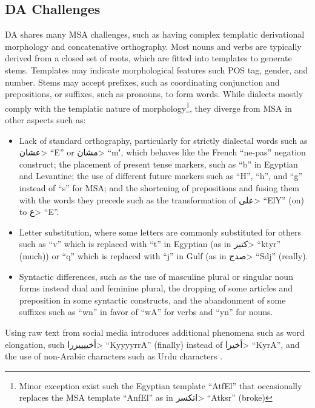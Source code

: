 \documentclass[11pt,letterpaper]{article}
\begin{document}
\subsection{DA Challenges}
DA shares many MSA challenges, such as having complex templatic derivational morphology and concatenative orthography. Most  nouns and verbs are typically derived from a closed set of roots, which are fitted into templates to generate stems. Templates may indicate morphological features such POS tag, gender, and number. Stems may accept prefixes, such as coordinating conjunction and prepositions, or suffixes, such as pronouns, to form words. While dialects mostly comply with the templatic nature of morphology\footnote{Minor exception exist such the Egyptian template ``AtfEl'' that occasionally replaces the MSA template ``AnfEl'' as in \<اتكسر> ``Atksr'' (broke)}, they diverge from MSA in other aspects such as:
\begin{itemize}[leftmargin=*]
\setlength\itemsep{-0.3em}
\item Lack of standard orthography, particularly for strictly dialectal words such as \<عشان> ``E\An'' or \<مشان> ``m\'', which behaves like the French ``ne-pas'' negation construct; the placement of present tense markers, such as ``b'' in Egyptian and Levantine; the use of different future markers such as ``H'', ``h'', and ``g'' instead of ``s'' for MSA; and the shortening of prepositions and fusing them with the words they precede such as the transformation of \<على> ``ElY'' (on) to \<ع> ``E''.
\item Letter substitution, where some letters are commonly substituted for others such as ``v'' which is replaced with ``t'' in Egyptian (as in \<كتير> ``ktyr'' (much)) or ``q'' which is replaced with ``j'' in Gulf (as in \<صدج> ``Sdj'' (really).  \item Syntactic differences, such as the use of masculine plural or singular noun forms instead dual and feminine plural, the dropping of some articles and preposition in some syntactic constructs, and the abandonment of some suffixes such as ``wn'' in favor of ``wA'' for verbs and ``yn'' for nouns.
\end{itemize}

Using raw text from social media introduces additional phenomena such as word elongation, such \<أخييييررا> ``KyyyyrrA'' (finally) instead of \<أخيرا> ``KyrA'', and the use of non-Arabic characters such as Urdu characters \cite{darwish2012language}.
\end{document}
